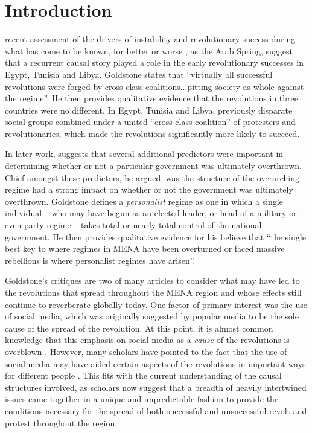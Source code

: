 \section{Introduction}

 recent assessment of the drivers of instability and revolutionary success during what has come to be known, for better or worse \cite{gelvin_arab_2015}, as the Arab Spring, suggest that a recurrent causal story played a role in the early revolutionary successes in Egypt, Tunisia and Libya.  Goldstone states that ``virtually all successful revolutions were forged by cross-class coalitions...pitting society as whole against the regime''. He then provides qualitative evidence that the revolutions in three countries were no different.  In Egypt, Tunisia and Libya, previously disparate social groups combined under a united ``cross-class coalition'' of protesters and revolutionaries, which made the revolutions significantly more likely to succeed.

In later work, \citeauthor{goldstone_bringing_2013} \citeyearpar{goldstone_bringing_2013} suggests that several additional predictors were important in determining whether or not a particular government was ultimately overthrown.  Chief amongst these predictors, he argued, was the structure of the overarching regime had a strong impact on whether or not the government was ultimately overthrown.  Goldstone defines a \emph{personalist} regime as one in which a single individual – who may have begun as an elected leader, or head of a military or even party regime – takes total or nearly total control of the national government. He then provides qualitative evidence for his believe that ``the single best key to where regimes in MENA have been overturned or faced massive rebellions is where personalist regimes have arisen''.
 
Goldstone's critiques are two of many articles to consider what may have led to the revolutions that spread throughout the MENA region and whose effects still continue to reverberate globally today. One factor of primary interest was the use of social media, which was originally suggested by popular media to be the sole cause of the spread of the revolution. At this point, it is almost common knowledge that this emphasis on social media as a \emph{cause} of the revolutions is overblown \citep{bruns_arab_2013,goldstone_bringing_2013,comunello_will_2012}. However, many scholars have pointed to the fact that the use of social media may have aided certain aspects of the revolutions in important ways for different people  \citep{galle_who_2013,starbird_how_2012,papacharissi_affective_2012,lotan_revolutions_2011,bruns_arab_2013}.  This fits with the current understanding of the causal structures involved,  as scholars now suggest that a breadth of heavily intertwined issues came together in a unique and unpredictable fashion to provide the conditions necessary for the spread of both successful and unsuccessful revolt and protest throughout the region. 


